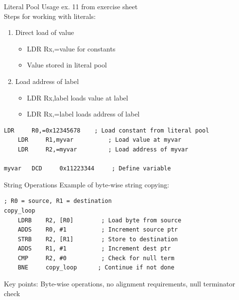 \begin{KR}{Literal Pool Usage} ex. 11 from exercise sheet\\
Steps for working with literals:
\begin{enumerate}
  \item Direct load of value
    \begin{itemize}
      \item LDR Rx,=value for constants
      \item Value stored in literal pool
    \end{itemize}
  \item Load address of label
    \begin{itemize}
      \item LDR Rx,label loads value at label
      \item LDR Rx,=label loads address of label
    \end{itemize}
\end{enumerate}
\begin{lstlisting}[language=armasm, style=basesmol]
    LDR     R0,=0x12345678    ; Load constant from literal pool
    LDR     R1,myvar          ; Load value at myvar
    LDR     R2,=myvar         ; Load address of myvar
    
myvar   DCD     0x11223344     ; Define variable
\end{lstlisting}
\end{KR}

\begin{example2}{String Operations}
Example of byte-wise string copying:
\begin{lstlisting}[language=armasm, style=basesmol]
    ; R0 = source, R1 = destination
copy_loop
    LDRB    R2, [R0]        ; Load byte from source
    ADDS    R0, #1          ; Increment source ptr
    STRB    R2, [R1]        ; Store to destination
    ADDS    R1, #1          ; Increment dest ptr
    CMP     R2, #0          ; Check for null term
    BNE     copy_loop      ; Continue if not done
\end{lstlisting}
\small
Key points: Byte-wise operations, no alignment requirements, null terminator check
\end{example2}


